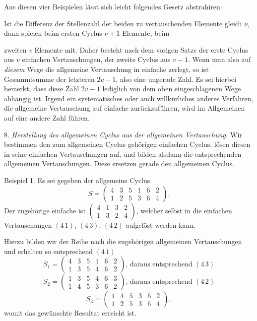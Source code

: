 \documentclass[11pt]{article}
\providecommand{\weberpage}[1]{}
\begin{document}
Aus diesen vier Beispielen lässt sich leicht folgendes Gesetz
abstrahiren:

\glqq Ist die Differenz der Stellenzahl der beiden zu vertauschenden
Elemente gleich $\nu$, dann spielen beim ersten Cyclus $\nu+1$ Elemente,
beim


\weberpage{9}
zweiten $v$ Elemente mit. Daher besteht nach dem vorigen Satze der erste Cyclus aus $v$ einfachen Vertauschungen, der zweite Cyclus aus $v-1$. Wenn man also auf \emph{diesem} Wege die allgemeine Vertauschung in einfache zerlegt, so ist Gesammtsumme der letzteren $2v-1$, also eine ungerade Zahl.\glqq{} Es sei hierbei bemerkt, dass diese Zahl $2v-1$ lediglich von dem oben eingeschlagenen Wege abhängig ist. Irgend ein systematisches oder auch willkürliches anderes Verfahren, die allgemeine Vertauschung auf einfache zurückzuführen, wird im Allgemeinen auf eine andere Zahl führen.

8. \emph{Herstellung des allgemeinen Cyclus aus der allgemeinen Vertauschung.} Wir bestimmen den zum allgemeinen Cyclus gehörigen einfachen Cyclus, lösen diesen in seine einfachen Vertauschungen auf, und bilden alsdann die entsprechenden allgemeinen Vertauschungen. Diese ersetzen gerade den allgemeinen Cyclus.

Beispiel 1. Es sei gegeben der allgemeine Cyclus
\[
S = \begin{pmatrix} 4 & 3 & 5 & 1 & 6 & 2 \\ 1 & 2 & 5 & 3 & 6 & 4 \end{pmatrix}.
\]
Der zugehörige einfache ist $\begin{pmatrix} 4 & 1 & 3 & 2 \\ 1 & 3 & 2 & 4 \end{pmatrix}$, welcher selbst in die einfachen Vertauschungen $(4\,1)$, $(4\,3)$, $(4\,2)$ aufgelöst werden kann.

Hierzu bilden wir der Reihe nach die zugehörigen allgemeinen Vertauschungen und erhalten so entsprechend $(4\,1)$
\[
S_1 = \begin{pmatrix} 4 & 3 & 5 & 1 & 6 & 2 \\ 1 & 3 & 5 & 4 & 6 & 2 \end{pmatrix}\text{, daraus entsprechend } (4\,3)
\]
\[
S_2 = \begin{pmatrix} 1 & 3 & 5 & 4 & 6 & 3 \\ 1 & 4 & 5 & 3 & 6 & 2 \end{pmatrix}\text{, daraus entsprechend } (4\,2) %
\]
\[
S_3 = \begin{pmatrix} 1 & 4 & 5 & 3 & 6 & 2 \\ 1 & 2 & 5 & 3 & 6 & 4 \end{pmatrix},
\]
womit das gewünschte Resultat erreicht ist.
\end{document}
